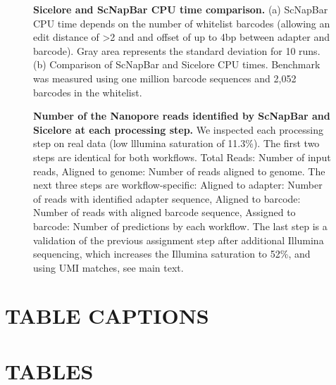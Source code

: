 \documentclass[times, 11pt, a4paper]{article}
\begin{document}
\begin{figure}[h!]
     \centering
     \begin{subfigure}[t]{0.35\textwidth}
         \caption{}
         \label{fig:cpu-rt}
         \centering
     \end{subfigure}
     \hfill
     \begin{subfigure}[t]{0.55\textwidth}
         \caption{}
         \label{fig:ctime-sis}
         \centering
     \end{subfigure}
        \caption{\textbf{Sicelore and ScNapBar CPU time comparison.} (a) ScNapBar CPU time depends on the number of whitelist barcodes (allowing an edit distance of  \textgreater 2 and and offset of up to 4bp between adapter and barcode). Gray area represents the standard deviation for 10 runs. (b) Comparison of ScNapBar and Sicelore CPU times. Benchmark was measured using one million barcode sequences and 2,052 barcodes in the whitelist. }
        \label{fig:runtime}
\end{figure}

\begin{figure}[h!]
         \centering
         \label{fig:fc1realsteps}
        \caption{\textbf{Number of the Nanopore reads identified by ScNapBar and Sicelore at each processing step.}  We inspected each processing step on real data (low lllumina saturation of 11.3\%). The first two steps are identical for both workflows. Total Reads: Number of input reads, Aligned to genome: Number of reads aligned to genome. The next three steps are workflow-specific: Aligned to adapter: Number of reads with identified adapter sequence, Aligned to barcode: Number of reads with aligned barcode sequence, Assigned to barcode: Number of predictions by each workflow. The last step is a validation of the previous assignment step after additional Illumina sequencing, which increases the Illumina saturation to 52\%, and using UMI matches, see main text.}
        \label{fig:realsteps}
\end{figure}

\section*{TABLE CAPTIONS}
\section*{TABLES}
\end{document}
